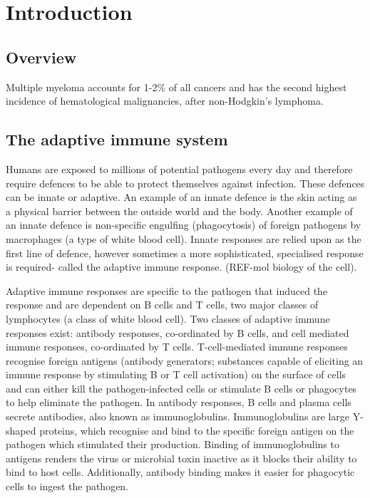 \chapter{\label{ch:1-intro}Introduction} 


\section{Overview}
Multiple myeloma accounts for 1-2\% of all cancers and has the second highest incidence of hematological malignancies, after non-Hodgkin’s lymphoma\cite{international2003criteria}.

\section{The adaptive immune system}
Humans are exposed to millions of potential pathogens every day and therefore require defences to be able to protect themselves against infection. These defences can be innate or adaptive. An example of an innate defence is the skin acting as a physical barrier between the outside world and the body. Another example of an innate defence is non-specific engulfing (phagocytosis) of foreign pathogens by macrophages (a type of white blood cell). Innate responses are relied upon as the first line of defence, however sometimes a more sophisticated, specialised response is required- called the adaptive immune response. (REF-mol biology of the cell).

Adaptive immune responses are specific to the pathogen that induced the response and are dependent on B cells and T cells, two major classes of lymphocytes (a class of white blood cell).
Two classes of adaptive immune responses exist: antibody responses, co-ordinated by B cells, and cell mediated immune responses, co-ordinated by T cells.
T-cell-mediated immune responses recognise foreign antigens (antibody generators; substances capable of eliciting an immune response by stimulating B or T cell activation) on the surface of cells and can either kill the pathogen-infected cells or stimulate B cells or phagocytes to help eliminate the pathogen.
In antibody responses, B cells and plasma cells secrete antibodies, also known as immunoglobulins.
Immunoglobulins are large Y-shaped proteins, which recognise and bind to the specific foreign antigen on the pathogen which stimulated their production.
Binding of immunoglobulins to antigens renders the virus or microbial toxin inactive as it blocks their ability to bind to host cells.
Additionally, antibody binding makes it easier for phagocytic cells to ingest the pathogen.


